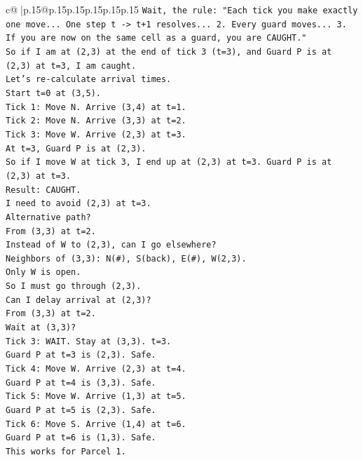 \documentclass{article}
\begin{document}
{\begin{supertabular}{c@{$\;$}|p{.15\linewidth}@{}p{.15\linewidth}p{.15\linewidth}p{.15\linewidth}p{.15\linewidth}p{.15\linewidth}}
{{{\texttt{Wait, the rule: "Each tick you make exactly one move... One step t {-}> t+1 resolves... 2. Every guard moves... 3. If you are now on the same cell as a guard, you are CAUGHT."} \\
\texttt{So if I am at (2,3) at the end of tick 3 (t=3), and Guard P is at (2,3) at t=3, I am caught.} \\
\texttt{Let's re{-}calculate arrival times.} \\
\texttt{Start t=0 at (3,5).} \\
\texttt{Tick 1: Move N. Arrive (3,4) at t=1.} \\
\texttt{Tick 2: Move N. Arrive (3,3) at t=2.} \\
\texttt{Tick 3: Move W. Arrive (2,3) at t=3.} \\
\texttt{At t=3, Guard P is at (2,3).} \\
\texttt{So if I move W at tick 3, I end up at (2,3) at t=3. Guard P is at (2,3) at t=3.} \\
\texttt{Result: CAUGHT.} \\
\texttt{I need to avoid (2,3) at t=3.} \\
\texttt{Alternative path?} \\
\texttt{From (3,3) at t=2.} \\
\texttt{Instead of W to (2,3), can I go elsewhere?} \\
\texttt{Neighbors of (3,3): N(\#), S(back), E(\#), W(2,3).} \\
\texttt{Only W is open.} \\
\texttt{So I must go through (2,3).} \\
\texttt{Can I delay arrival at (2,3)?} \\
\texttt{From (3,3) at t=2.} \\
\texttt{Wait at (3,3)?} \\
\texttt{Tick 3: WAIT. Stay at (3,3). t=3.} \\
\texttt{Guard P at t=3 is (2,3). Safe.} \\
\texttt{Tick 4: Move W. Arrive (2,3) at t=4.} \\
\texttt{Guard P at t=4 is (3,3). Safe.} \\
\texttt{Tick 5: Move W. Arrive (1,3) at t=5.} \\
\texttt{Guard P at t=5 is (2,3). Safe.} \\
\texttt{Tick 6: Move S. Arrive (1,4) at t=6.} \\
\texttt{Guard P at t=6 is (1,3). Safe.} \\
\texttt{This works for Parcel 1.} \\
}}}
\end{supertabular}}
\end{document}
